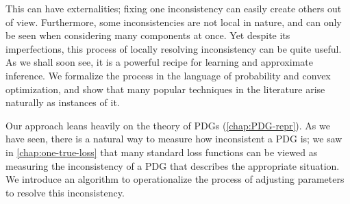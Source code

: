 This can have externalities; fixing one inconsistency can easily create
    others out of view.
Furthermore, some inconsistencies
    are not local in nature,
    and can only be seen when considering many components at once.
Yet despite its imperfections,
    this process of locally resolving inconsistency  can be quite useful.
    As we shall soon see,
    it is a powerful recipe for learning and approximate inference.
%
We formalize the process
    in the language of probability and
    convex optimization,
    and show that many popular techniques in the literature
    arise naturally as instances of it.



Our approach leans heavily on the theory of PDGs
        (\cref{chap:PDG-repr}).
As we have seen, there is a natural way
    to measure how inconsistent a PDG is;
    we saw in \cref{chap:one-true-loss} that
    many standard loss functions
    can be viewed as measuring the inconsistency of a PDG that
    describes the appropriate situation.
%
%
We introduce an algorithm
    to operationalize
    the process of adjusting parameters
    to resolve this inconsistency.

